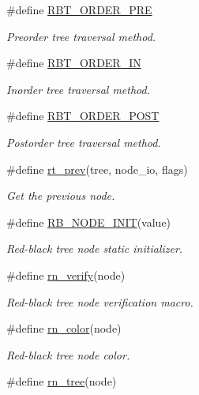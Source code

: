 \begin{CompactItemize}
\#define \hyperlink{group__dbprim__rbtree_a21}{RBT\_\-ORDER\_\-PRE}
\begin{CompactList}\small\item\em Preorder tree traversal method. \item\end{CompactList}\item 
\#define \hyperlink{group__dbprim__rbtree_a22}{RBT\_\-ORDER\_\-IN}
\begin{CompactList}\small\item\em Inorder tree traversal method. \item\end{CompactList}\item 
\#define \hyperlink{group__dbprim__rbtree_a23}{RBT\_\-ORDER\_\-POST}
\begin{CompactList}\small\item\em Postorder tree traversal method. \item\end{CompactList}\item 
\#define \hyperlink{group__dbprim__rbtree_a24}{rt\_\-prev}(tree, node\_\-io, flags)
\begin{CompactList}\small\item\em Get the previous node. \item\end{CompactList}\item 
\#define \hyperlink{group__dbprim__rbtree_a25}{RB\_\-NODE\_\-INIT}(value)
\begin{CompactList}\small\item\em Red-black tree node static initializer. \item\end{CompactList}\item 
\#define \hyperlink{group__dbprim__rbtree_a26}{rn\_\-verify}(node)
\begin{CompactList}\small\item\em Red-black tree node verification macro. \item\end{CompactList}\item 
\#define \hyperlink{group__dbprim__rbtree_a27}{rn\_\-color}(node)
\begin{CompactList}\small\item\em Red-black tree node color. \item\end{CompactList}\item 
\#define \hyperlink{group__dbprim__rbtree_a28}{rn\_\-tree}(node)

\end{CompactItemize}

